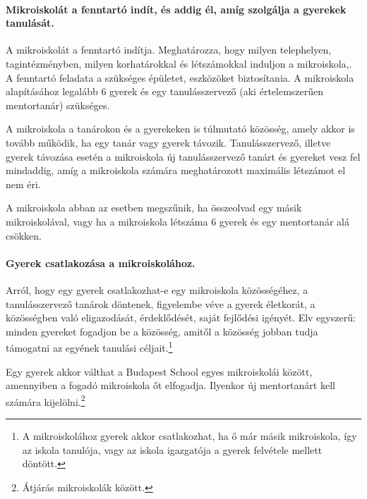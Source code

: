 \paragraph{Mikroiskolát a fenntartó indít, és addig él, amíg szolgálja a
      gyerekek tanulását.}
A mikroiskolát a fenntartó indítja. Meghatározza, hogy milyen telephelyen,
tagintézményben, milyen korhatárokkal és létszámokkal
induljon a mikroiskola,. A fenntartó feladata a szükséges épületet, eszközöket
biztosítania. A
mikroiskola alapításához legalább 6 gyerek és egy tanulásszervező (aki
értelemszerűen mentortanár)
szükséges.

A mikroiskola a tanárokon és a gyerekeken is túlmutató közösség, amely akkor is
tovább működik, ha egy tanár vagy gyerek távozik. Tanulásszerve\-ző, illetve
gyerek távozása esetén a mikroiskola  új tanulásszervező tanárt és gyereket
vesz fel mindaddig, amíg a mikroiskola számára meghatározott maximális
létszámot el nem éri.

A mikroiskola abban az esetben megszűnik, ha összeolvad egy másik
mikroiskolával, vagy
ha a mikroiskola létszáma 6 gyerek és egy mentortanár alá csökken.

\paragraph{Gyerek csatlakozása a mikroiskolához.}
Arról, hogy egy gyerek csatla\-kozhat-e egy mikroiskola közösségéhez, a
tanulásszervező
tanárok döntenek, figyelembe véve a gyerek életkorát, a közösségben való
eligazodását, érdeklődését, saját fejlődési igényét. Elv egyszerű: minden
gyereket fogadjon be a közösség, amitől a közösség jobban tudja támogatni az
egyének tanulási céljait.\footnote{A mikroiskolához gyerek akkor csatlakozhat,
      ha ő már másik mikroiskola, így az iskola tanulója, vagy az iskola
      igazgatója a
      gyerek felvétele mellett döntött.}


Egy gyerek akkor válthat a Budapest School egyes mikroiskolái között,
amennyiben a fogadó mikroiskola őt elfogadja. Ilyenkor új mentortanárt kell
számára kijelölni.\footnote{Átjárás mikroiskolák között.}
